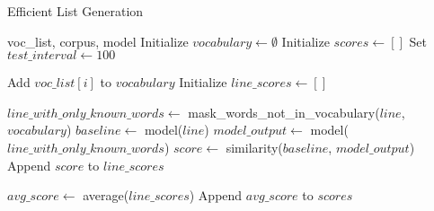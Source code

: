 \begin{algorithm}
\caption{Efficient List Generation}
\label{alg:efficiency-evaluation}
\begin{algorithmic}[1]
\Require voc\_list, corpus, model
\State Initialize $vocabulary \gets \emptyset$
\State Initialize $scores \gets []$
\State Set $test\_interval \gets 100$

    \State Add $voc\_list[i]$ to $vocabulary$
    \State Initialize $line\_scores \gets []$
    
        \State $line\_with\_only\_known\_words \gets$ mask\_words\_not\_in\_vocabulary($line$, $vocabulary$)
        \State $baseline \gets$ model($line$)
        \State $model\_output \gets$ model($line\_with\_only\_known\_words$)
        \State $score \gets$ similarity($baseline$, $model\_output$)
        \State Append $score$ to $line\_scores$
    \EndFor

    \State $avg\_score \gets$ average($line\_scores$)
    \State Append $avg\_score$ to $scores$
\EndFor

\end{algorithmic}
\end{algorithm}
